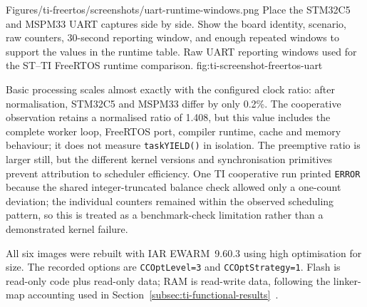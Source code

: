 \reportscreenshot
      {Figures/ti-freertos/screenshots/uart-runtime-windows.png}
      {Place the STM32C5 and MSPM33 UART captures side by side. Show the board identity, scenario, raw counters, 30-second reporting window, and enough repeated windows to support the values in the runtime table.}
      {Raw UART reporting windows used for the ST--TI FreeRTOS runtime comparison.}
      {fig:ti-screenshot-freertos-uart}

Basic processing scales almost exactly with the configured clock ratio: after normalisation,
STM32C5 and MSPM33 differ by only 0.2\%. The cooperative observation retains a normalised ratio
of 1.408, but this value includes the complete worker loop, FreeRTOS port, compiler runtime,
cache and memory behaviour; it does not measure \texttt{taskYIELD()} in isolation. The
preemptive ratio is larger still, but the different kernel versions and synchronisation
primitives prevent attribution to scheduler efficiency. One TI cooperative run printed
\texttt{ERROR} because the shared integer-truncated balance check allowed only a one-count
deviation; the individual counters remained within the observed scheduling pattern, so this is
treated as a benchmark-check limitation rather than a demonstrated kernel failure.

All six images were rebuilt with IAR EWARM~9.60.3 using high optimisation for size. The
recorded options are \texttt{CCOptLevel=3} and \texttt{CCOptStrategy=1}. Flash is read-only
code plus read-only data; RAM is read-write data, following the linker-map accounting used in
Section~\ref{subsec:ti-functional-results}~\cite{iar-ewarm}.

\begin{table}[H]
\centering
\caption{FreeRTOS whole-image footprint under IAR high/size optimisation (bytes).}
\label{tab:ti-freertos-footprint}
\end{table}


